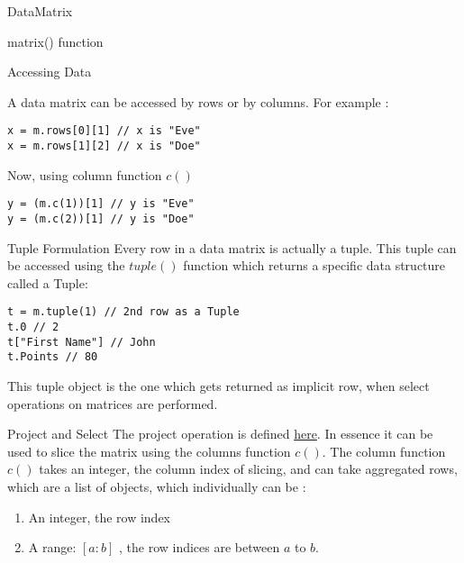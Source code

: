 \begin{section}{DataMatrix}
\begin{subsection}{matrix() function}
\end{subsection}

\begin{subsection}{Accessing Data}

A data matrix can be accessed by rows or by columns.
For example :

\begin{lstlisting}[style=JexlStyle]
x = m.rows[0][1] // x is "Eve"
x = m.rows[1][2] // x is "Doe" 
\end{lstlisting}

Now, using column function $c()$ 

\begin{lstlisting}[style=JexlStyle]
y = (m.c(1))[1] // y is "Eve"
y = (m.c(2))[1] // y is "Doe" 
\end{lstlisting}

\end{subsection}

\begin{subsection}{Tuple Formulation}
Every row in a data matrix is actually a tuple.
This tuple can be accessed using the $tuple()$ function which returns a specific 
data structure called a Tuple:

\begin{lstlisting}[style=JexlStyle]
t = m.tuple(1) // 2nd row as a Tuple 
t.0 // 2
t["First Name"] // John
t.Points // 80 
\end{lstlisting}

This  tuple object is the one which gets returned as implicit row, 
when select operations on matrices are performed.

\end{subsection}

\begin{subsection}{Project and Select}
The project operation is defined \href{https://en.wikipedia.org/wiki/Projection\_(relational\_algebra)}{here}.
In essence it can be used to slice the matrix using the columns function $c()$.
The column function $c()$ takes an integer, the column index of slicing, and can take aggregated 
rows, which are a list of objects, which individually can be :

\begin{enumerate}
\item{ An integer, the row index }
\item{ A range: $[a:b]$ , the row indices are between $a$ to $b$. }
\end{enumerate}


\end{subsection}
\end{section}
